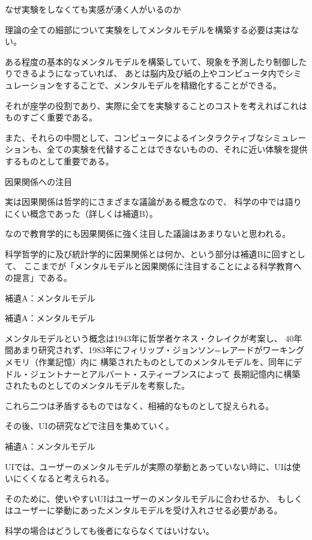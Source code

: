 \documentclass[12pt, unicode]{beamer}
\begin{document}
\begin{frame}{なぜ実験をしなくても実感が湧く人がいるのか}

理論の全ての細部について実験をしてメンタルモデルを構築する必要は実はない。

ある程度の基本的なメンタルモデルを構築していて、現象を予測したり制御したりできるようになっていれば、
あとは脳内及び紙の上やコンピュータ内でシミュレーションをすることで、メンタルモデルを精緻化することができる。

それが座学の役割であり、実際に全てを実験することのコストを考えればこれはものすごく重要である。

また、それらの中間として、コンピュータによるインタラクティブなシミュレーションも、全ての実験を代替することはできないものの、それに近い体験を提供するものとして重要である。

\end{frame}

\begin{frame}{因果関係への注目}

実は因果関係は哲学的にさまざまな議論がある概念なので、
科学の中では語りにくい概念であった（詳しくは補遺B）。

なので教育学的にも因果関係に強く注目した議論はあまりないと思われる。

科学哲学的に及び統計学的に因果関係とは何か、という部分は補遺Bに回すとして、
ここまでが「メンタルモデルと因果関係に注目することによる科学教育への提言」である。

\end{frame}

\begin{frame}
{\LARGE 補遺A：メンタルモデル}
\end{frame}

\begin{frame}{補遺A：メンタルモデル}

メンタルモデルという概念は1943年に哲学者ケネス・クレイクが考案し、
40年間あまり研究されず、1983年にフィリップ・ジョンソン=レアードがワーキングメモリ（作業記憶）内に
構築されたものとしてのメンタルモデルを、同年にデドル・ジェントナーとアルバート・スティーブンスによって
長期記憶内に構築されたものとしてのメンタルモデルを考察した。

これら二つは矛盾するものではなく、相補的なものとして捉えられる。

その後、UIの研究などで注目を集めていく。

\end{frame}

\begin{frame}{補遺A：メンタルモデル}

UIでは、ユーザーのメンタルモデルが実際の挙動とあっていない時に、UIは使いにくくなると考えられる。

そのために、使いやすいUIはユーザーのメンタルモデルに合わせるか、
もしくはユーザーに挙動にあったメンタルモデルを受け入れさせる必要がある。

科学の場合はどうしても後者にならなくてはいけない。

\end{frame}
\end{document}
